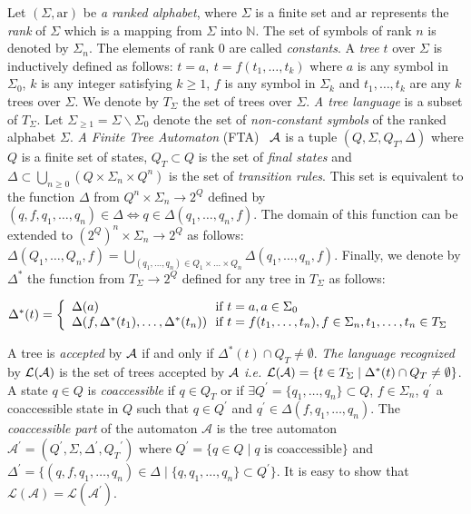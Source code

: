 \documentclass{llncs}
\begin{document}
    Let $(\Sigma,\mathrm{ar})$ be  \emph{a ranked alphabet}, where $\Sigma$ is a finite set and $\mathrm{ar}$ represents the  \emph{rank} of $\Sigma$ which is a mapping from $\Sigma$ into $\mathbb{N}$. The set of symbols of rank $n$ is denoted by $\Sigma_{n}$. The elements of rank $0$ are called  \emph{constants}. A \emph{tree} $t$ over   $\Sigma$ is inductively defined as follows: $t=a,~ t=f(t_1,\dots,t_k)$ where $a$ is any symbol in  $\Sigma_0$, $k$ is any integer satisfying $k\geq 1$, $f$ is any symbol in $\Sigma_k$ and $t_1,\dots,t_k$ are any $k$ trees over $\Sigma$. We denote by $T_{\Sigma}$ the set of trees over $\Sigma$.  \emph{A tree language} is a subset of $T_{\Sigma}$. Let ${\Sigma}_{\geq 1}=\Sigma\backslash \Sigma_0$ denote the set of  \emph{non-constant symbols} of the ranked alphabet $\Sigma$. \emph{A Finite Tree Automaton} (FTA)~\cite{automate1,automate2} ${\cal A}$ is a tuple $( Q, \Sigma, Q_{T},\Delta )$ where $Q$ is a finite set of states, $Q_T \subset Q$ is the set of \emph{final states} 
and  $\Delta\subset\bigcup_{n\geq 0}(Q \times \Sigma_{n}\times Q^n)$ is the set of  \emph{transition rules}. This set is equivalent to the function $\Delta$ from  $Q^n \times \Sigma_n \rightarrow 2^Q$ defined  by $(q,f,q_1,\dots,q_n)\in \Delta\Leftrightarrow q\in \Delta(q_1,\dots,q_n,f)$. The domain of this function can be extended to  $(2^Q)^n \times \Sigma_n  \rightarrow 2^Q$  as follows: $\Delta(Q_1,\dots,Q_n,f)=\bigcup_{(q_1,\dots,q_n)\in Q_1\times\dots\times Q_n} \Delta(q_1,\dots,q_n,f)$.  Finally, we denote by $\Delta^*$ the function from  $T_{\Sigma}\rightarrow 2^Q$  defined for any tree in $T_{\Sigma}$ as follows: 
    
  \centerline{
    $\Delta^*(t)=
      \left\{
        \begin{array}{l@{\ }l}
          \Delta(a) & \text{ if } t=a, a\in \Sigma_0 \\
          \Delta(f,\Delta^*(t_1),\dots,\Delta^*(t_n)) & \text{ if } t=f(t_1,\dots,t_n), f\in {\Sigma}_n, t_1,\ldots,t_n\in T_{\Sigma}
        \end{array}
      \right.$
  }
\noindent A tree is \emph{accepted} by ${\cal A}$ if and only if $\Delta^*(t)\cap Q_T\neq \emptyset$.   \emph{The language recognized} by ${\cal L(A)}$ is the set of trees accepted by ${\cal A}$  \emph{i.e.} ${\cal L(A)}=\{t\in T_{\Sigma}\mid \Delta^*(t)\cap Q_T\neq \emptyset\}$. A state $q\in Q$ is \emph{coaccessible} if $q\in Q_T$ or if $\exists Q^\prime=\{q_1,\ldots,q_n\}\subset Q$, $f\in \Sigma_n$, $q^\prime$ a coaccessible state in $Q$ such that $q\in Q^\prime$ and $q^\prime \in \Delta(f, q_1,\ldots, q_n)$. The \emph{coaccessible part} of the automaton $\mathcal{A}$ is the tree automaton $\mathcal{A}^\prime=(Q^\prime,\Sigma, \Delta^\prime, {Q_T}^\prime)$ where $Q^\prime=\{q\in Q\mid q \mbox{ is coaccessible}\}$ and $\Delta^\prime=\{(q,f,q_1,\ldots,q_n)\in \Delta \mid \{q,q_1,\ldots,q_n\}\subset Q^\prime\}$. It is easy to show that $\mathcal{L}(\mathcal{A})=\mathcal{L}(\mathcal{A^\prime})$. 
\end{document}
